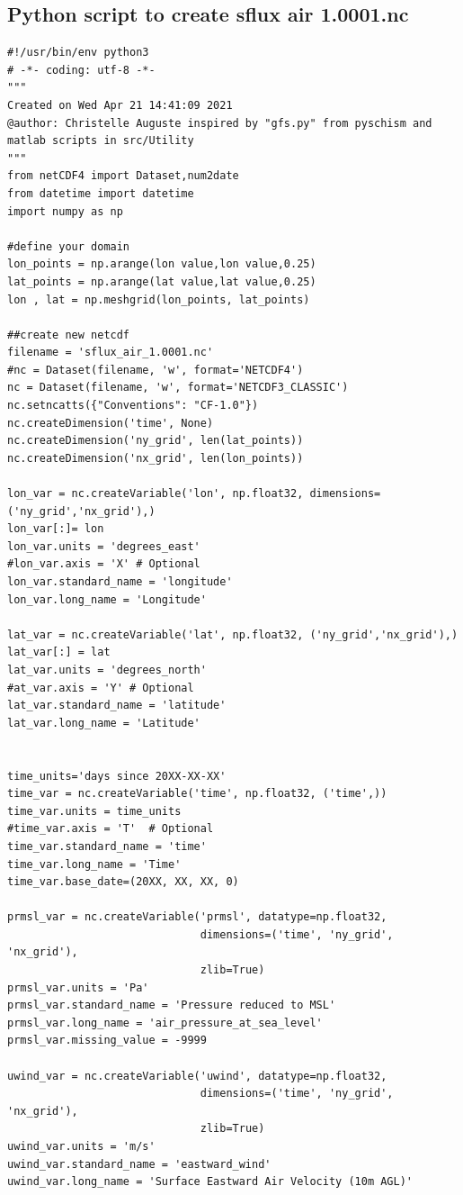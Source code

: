 \documentclass[preprints,briefreport,accept,oneauthor,pdftex]{Definitions/mdpi}
\begin{document}
\subsection{Python script to create sflux air 1.0001.nc}
\begin{verbatim}
#!/usr/bin/env python3
# -*- coding: utf-8 -*-
"""
Created on Wed Apr 21 14:41:09 2021
@author: Christelle Auguste inspired by "gfs.py" from pyschism and matlab scripts in src/Utility
"""
from netCDF4 import Dataset,num2date
from datetime import datetime
import numpy as np

#define your domain
lon_points = np.arange(lon value,lon value,0.25)
lat_points = np.arange(lat value,lat value,0.25)
lon , lat = np.meshgrid(lon_points, lat_points)

##create new netcdf
filename = 'sflux_air_1.0001.nc'
#nc = Dataset(filename, 'w', format='NETCDF4')
nc = Dataset(filename, 'w', format='NETCDF3_CLASSIC')
nc.setncatts({"Conventions": "CF-1.0"})
nc.createDimension('time', None)
nc.createDimension('ny_grid', len(lat_points)) 
nc.createDimension('nx_grid', len(lon_points)) 

lon_var = nc.createVariable('lon', np.float32, dimensions=('ny_grid','nx_grid'),)
lon_var[:]= lon
lon_var.units = 'degrees_east'
#lon_var.axis = 'X' # Optional
lon_var.standard_name = 'longitude'
lon_var.long_name = 'Longitude'

lat_var = nc.createVariable('lat', np.float32, ('ny_grid','nx_grid'),)
lat_var[:] = lat
lat_var.units = 'degrees_north'
#at_var.axis = 'Y' # Optional
lat_var.standard_name = 'latitude'
lat_var.long_name = 'Latitude'


time_units='days since 20XX-XX-XX'
time_var = nc.createVariable('time', np.float32, ('time',))
time_var.units = time_units
#time_var.axis = 'T'  # Optional
time_var.standard_name = 'time' 
time_var.long_name = 'Time'
time_var.base_date=(20XX, XX, XX, 0)

prmsl_var = nc.createVariable('prmsl', datatype=np.float32,
                              dimensions=('time', 'ny_grid', 'nx_grid'),
                              zlib=True)
prmsl_var.units = 'Pa'
prmsl_var.standard_name = 'Pressure reduced to MSL'
prmsl_var.long_name = 'air_pressure_at_sea_level'
prmsl_var.missing_value = -9999

uwind_var = nc.createVariable('uwind', datatype=np.float32,
                              dimensions=('time', 'ny_grid', 'nx_grid'),
                              zlib=True)
uwind_var.units = 'm/s'
uwind_var.standard_name = 'eastward_wind'
uwind_var.long_name = 'Surface Eastward Air Velocity (10m AGL)'


\end{verbatim}
\end{document}
